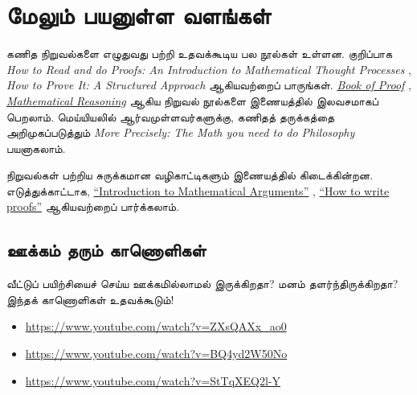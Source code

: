 \documentclass[../../../include/open-logic-section]{subfiles}
\begin{document}
\section{மேலும் பயனுள்ள வளங்கள்}

கணித நிறுவல்களை எழுதுவது பற்றி உதவக்கூடிய
பல நூல்கள் உள்ளன. குறிப்பாக
\emph{How to Read and do Proofs: An Introduction to
Mathematical Thought Processes} \citep{Solow2013},
\emph{How to Prove It: A Structured Approach}
\citep{Velleman2019} ஆகியவற்றைப் பாருங்கள்.
\href{http://www.people.vcu.edu/~rhammack/BookOfProof/BookOfProof.pdf}{\emph{Book
of Proof}} \citep{Hammack2013},
\href{https://scholarworks.gvsu.edu/books/7/}{\emph{Mathematical
Reasoning}} \citep{Sandstrum2019} ஆகிய நிறுவல்
நூல்களை இணையத்தில் இலவசமாகப் பெறலாம்.
மெய்யியலில் ஆர்வமுள்ளவர்களுக்கு, கணிதத் தருக்கத்தை
அறிமுகப்படுத்தும் \emph{More Precisely: The Math you
need to do Philosophy} \citep{Steinhart2018} பயனாகலாம்.

நிறுவல்கள் பற்றிய சுருக்கமான வழிகாட்டிகளும்
இணையத்தில் கிடைக்கின்றன. எடுத்துக்காட்டாக,
\href{https://math.berkeley.edu/~hutching/teach/proofs.pdf}{``Introduction
  to Mathematical Arguments''} \citep{Hutchings2003},
\href{https://eugeniacheng.com/wp-content/uploads/2017/02/cheng-proofguide.pdf}{``How to
  write proofs''} \citep{Cheng2004} ஆகியவற்றைப்
பார்க்கலாம்.

\subsection{ஊக்கம் தரும் காணொளிகள்}

வீட்டுப் பயிற்சியைச் செய்ய ஊக்கமில்லாமல்
இருக்கிறதா? மனம் தளர்ந்திருக்கிறதா? இந்தக்
காணொளிகள் உதவக்கூடும்!

\begin{itemize}
\item \url{https://www.youtube.com/watch?v=ZXsQAXx_ao0}
\item \url{https://www.youtube.com/watch?v=BQ4yd2W50No}
\item \url{https://www.youtube.com/watch?v=StTqXEQ2l-Y}
\end{itemize}
\end{document}
